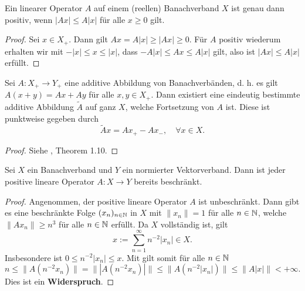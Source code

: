 \begin{bem}\label{Charakterisierung positiver Operatoren}
Ein linearer Operator $A$ auf einem (reellen) Banachverband $X$ ist genau dann positiv, wenn $|Ax|\leq A|x|$ für alle $x\geq0$ gilt.
\end{bem}

\begin{proof}
Sei $x\in X_+$. Dann gilt $Ax= A|x| \geq |Ax|\geq0$. Für $A$ positiv wiederum erhalten wir mit $-|x|\leq x\leq |x|$, dass $-A|x|\leq Ax\leq A|x|$ gilt, also ist $|Ax|\leq A|x|$ erfüllt. 
\end{proof}

\begin{satz}[Kantorovich]\label{Fortsetzung positiver Operatoren auf dem positiven Kegel}
Sei $A\colon X_+\to Y_+$  eine additive Abbildung von Banachverbänden, d. h. es gilt $A(x+y)=Ax+Ay$ für alle $x,y\in X_+$. Dann existiert eine eindeutig bestimmte additive Abbildung $\widetilde A$ auf ganz $X$, welche Fortsetzung von $A$ ist. Diese ist punktweise gegeben durch
\begin{equation*}
\widetilde Ax = Ax_{+} - Ax_{-},\quad\forall x\in X.
\end{equation*}
\end{satz}

\begin{proof}
Siehe \cite{aliprantis_burkinshaw_2006}, Theorem 1.10.
\end{proof}

\begin{satz}\label{Beschränktheit positiver Operatoren}
Sei $X$ ein Banachverband und  $Y$ ein normierter Vektorverband. Dann ist jeder positive lineare Operator  $A\colon X\to Y$ bereits beschränkt.
\end{satz}

\begin{proof}
Angenommen, der positive lineare Operator $A$ ist unbeschränkt. Dann gibt es eine beschränkte Folge $(x_n)_{n\in\mathbb{N}}$ in $X$ mit $\|x_n\|=1$ für alle $n\in\mathbb{N}$, welche $\|Ax_n\|\geq n^3$ für alle $n\in\mathbb{N}$ erfüllt. Da $X$ vollständig ist, gilt 
\begin{equation*}
    x:=\sum_{n=1}^\infty n^{-2}|x_n|\in X.
\end{equation*}
Insbesondere ist $0\leq n^{-2}|x_n|\leq x$. Mit  gilt somit für alle $n\in\mathbb{N}$
\begin{equation*}
n \leq \|A(n^{-2}x_n)\|= \||A(n^{-2}x_n)|\| \leq \|A(n^{-2}|x_n|)\|\leq \|A|x|\|<+\infty.
\end{equation*}
Dies ist ein  \textbf{Widerspruch}.%
\end{proof}

